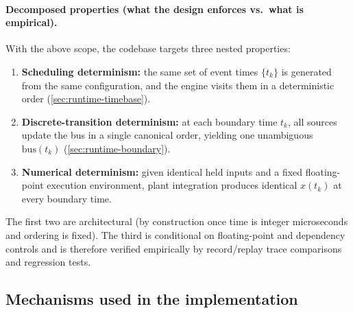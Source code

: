 \paragraph{Decomposed properties (what the design enforces vs.\ what is empirical).}
With the above scope, the codebase targets three nested properties:
\begin{enumerate}[leftmargin=*]
  \item \textbf{Scheduling determinism:} the same set of event times \(\{t_k\}\) is generated from the same configuration, and the engine visits them in a deterministic order (\cref{sec:runtime-timebase}).
  \item \textbf{Discrete-transition determinism:} at each boundary time \(t_k\), all sources update the bus in a single canonical order, yielding one unambiguous \(\mathrm{bus}(t_k)\) (\cref{sec:runtime-boundary}).
  \item \textbf{Numerical determinism:} given identical held inputs and a fixed floating-point execution environment, plant integration produces identical \(x(t_k)\) at every boundary time.
\end{enumerate}
The first two are architectural (by construction once time is integer microseconds and ordering is fixed). The third is conditional on floating-point and dependency controls and is therefore verified empirically by record/replay trace comparisons and regression tests.

\subsection{Mechanisms used in the implementation}
\label{sec:determinism-mechanisms}

